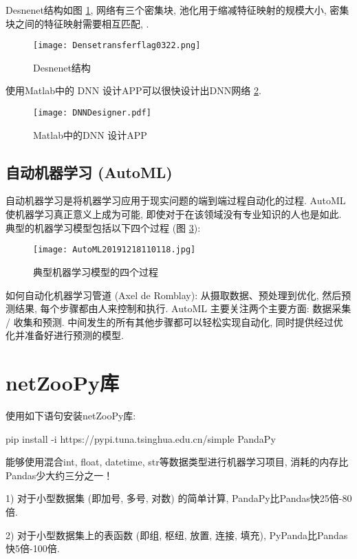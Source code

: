 Desnenet结构如图 \ref{Densetransferflag03220304}, 网络有三个密集块, 池化用于缩减特征映射的规模大小, 密集块之间的特征映射需要相互匹配, .
\begin{figure}[H]
    \centering
    \texttt{[image: Densetransferflag0322.png]}
    \caption{Desnenet结构}
    \label{Densetransferflag03220304}
\end{figure}

使用Matlab中的 DNN 设计APP可以很快设计出DNN网络 \ref{DNNDesigner20200304}.
\begin{figure}[H]
    \centering
    \texttt{[image: DNNDesigner.pdf]}
    \caption{Matlab中的DNN 设计APP}
    \label{DNNDesigner20200304}
\end{figure}
\subsection{自动机器学习 (AutoML)}
自动机器学习是将机器学习应用于现实问题的端到端过程自动化的过程.
AutoML 使机器学习真正意义上成为可能, 即使对于在该领域没有专业知识的人也是如此.
典型的机器学习模型包括以下四个过程 (图 \ref{AutoML2019fig2702}):
\begin{figure}[H]
    \centering
    \texttt{[image: AutoML20191218110118.jpg]}
    \caption{典型机器学习模型的四个过程}
    \label{AutoML2019fig2702}
\end{figure}
如何自动化机器学习管道 (Axel de Romblay):
从摄取数据、预处理到优化, 然后预测结果, 每个步骤都由人来控制和执行.
AutoML 主要关注两个主要方面: 数据采集 / 收集和预测.
中间发生的所有其他步骤都可以轻松实现自动化, 同时提供经过优化并准备好进行预测的模型.
\section{netZooPy库}
使用如下语句安装netZooPy库:

pip install -i https://pypi.tuna.tsinghua.edu.cn/simple PandaPy

能够使用混合int, float, datetime, str等数据类型进行机器学习项目, 消耗的内存比Pandas少大约三分之一！

1) 对于小型数据集 (即加号, 多号, 对数) 的简单计算, PandaPy比Pandas快25倍-80倍.

2) 对于小型数据集上的表函数 (即组, 枢纽, 放置, 连接, 填充), PyPanda比Pandas快5倍-100倍.

